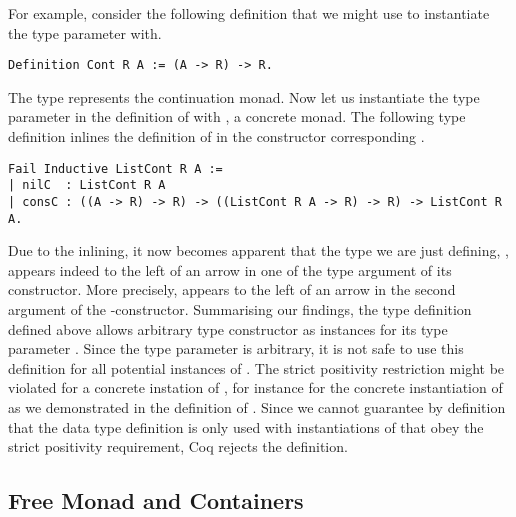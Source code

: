 For example, consider the following definition that we might use to
instantiate the type parameter with.

\begin{verbatim}
Definition Cont R A := (A -> R) -> R.
\end{verbatim}

The type  represents the continuation monad.
Now let us instantiate the type parameter  in the definition
of  with , a concrete monad.
The following type definition  inlines the definition
of  in the constructor corresponding .

\begin{verbatim}
Fail Inductive ListCont R A :=
| nilC  : ListCont R A
| consC : ((A -> R) -> R) -> ((ListCont R A -> R) -> R) -> ListCont R A.
\end{verbatim}

Due to the inlining, it now becomes apparent that the type we are just
defining, , appears indeed to the left of an arrow in
one of the type argument of its constructor.
More precisely,  appears to the left of an arrow in the
second argument of the -constructor.
Summarising our findings, the type definition  defined
above allows arbitrary type constructor as instances for its type
parameter .
Since the type parameter is arbitrary, it is not safe to use this
definition for all potential instances of .
The strict positivity restriction might be violated for a concrete
instation of , for instance for the concrete instantiation of
 as we demonstrated in the definition of .
Since we cannot guarantee by definition that the data type definition
 is only used with instantiations of  that obey the
strict positivity requirement, Coq rejects the definition.

\subsection{Free Monad and Containers}
\label{subsec:freeAndContainers}


